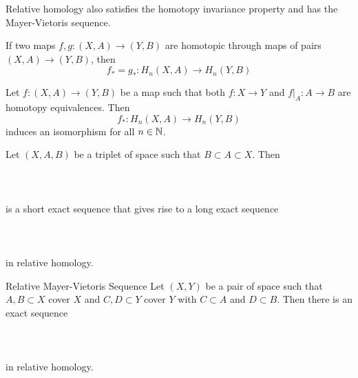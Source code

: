 \documentclass[a4paper]{article}
\begin{document}
Relative homology also satisfies the homotopy invariance property and has the Mayer-Vietoris sequence. 

\begin{prp}{}{} If two maps $f,g:(X,A)\to (Y,B)$ are homotopic through maps of pairs $(X,A)\to(Y,B)$, then $$f_\ast=g_\ast:H_n(X,A)\to H_n(Y,B)$$ 
\end{prp}

\begin{crl}{}{} Let $f:(X,A)\to (Y,B)$ be a map such that both $f:X\to Y$ and $f|_A:A\to B$ are homotopy equivalences. Then $$f_\ast:H_n(X,A)\to H_n(Y,B)$$ induces an isomorphism for all $n\in\mathbb{N}$. 
\end{crl}

\begin{prp}{}{} Let $(X,A,B)$ be a triplet of space such that $B\subset A\subset X$. Then \\~\\
\\~\\
is a short exact sequence that gives rise to a long exact sequence \\~\\
\\~\\
in relative homology. 
\end{prp}

\begin{prp}{Relative Mayer-Vietoris Sequence}{} Let $(X,Y)$ be a pair of space such that $A,B\subset X$ cover $X$ and $C,D\subset Y$ cover $Y$ with $C\subset A$ and $D\subset B$. Then there is an exact sequence \\~\\
\\~\\
in relative homology. 
\end{prp}
\end{document}
